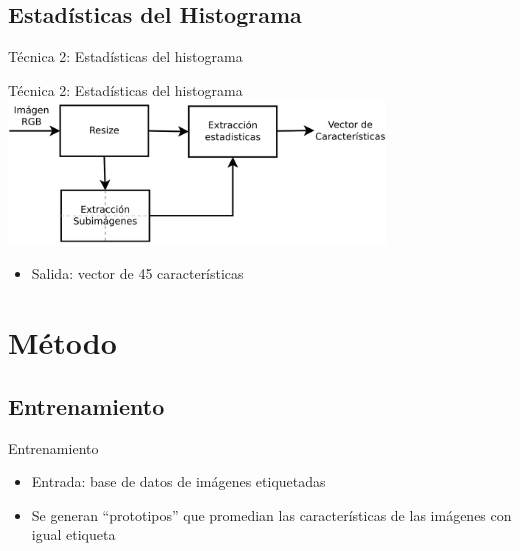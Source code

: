 \documentclass[spanish]{beamer}
\begin{document}
\subsection{Estadísticas del Histograma}
\begin{frame}{Técnica 2: Estadísticas del histograma}
\end{frame}
\begin{frame}{Técnica 2: Estadísticas del histograma}
  \includegraphics[width=10cm]{../diagramas/procesoestadisticas}
  \begin{itemize}
  \item Salida: vector de 45 características
  \end{itemize}
\end{frame}
%
\section{Método}
%
\subsection{Entrenamiento}
\begin{frame}{Entrenamiento}
  \begin{itemize}
  \item Entrada: base de datos de imágenes etiquetadas
  \item Se generan ``prototipos'' que promedian las características de las
    imágenes con igual etiqueta
  \end{itemize}
\end{frame}
%
\end{document}
